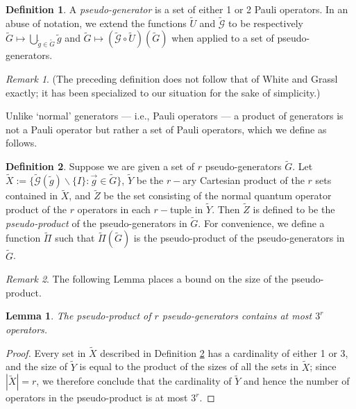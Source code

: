 \documentclass{amsbook}
\theoremstyle{plain}
\newtheorem{lemma}{Lemma}
\theoremstyle{definition}
\newtheorem{definition}{Definition}
\theoremstyle{remark}
\newtheorem{remark}{Remark}
\newcommand{\lst}{\vec}
\newcommand{\set}{\tilde}
\newcommand{\genfun}{\tilde{\mathcal{G}}}
\newcommand{\pseudoproduct}{\set\Pi}
\begin{document}
\begin{definition}
A \emph{pseudo-generator} is a set of either 1 or 2 Pauli operators.  In an abuse of notation, we extend the functions $\set U$ and $\genfun$ to be respectively $\set G\mapsto \bigcup_{\set g\in\set G} \set g$ and $\set G\mapsto (\genfun\circ\set U)(\set G)$ when applied to a set of pseudo-generators.
\end{definition}
\begin{remark}
(The preceding definition does not follow that of White and Grassl exactly; it has been specialized to our situation for the sake of simplicity.)

Unlike `normal' generators --- i.e., Pauli operators --- a product of generators is not a Pauli operator but rather a set of Pauli operators, which we define as follows.
\end{remark}

\begin{definition}
\label{definition:pseudo-product}
Suppose we are given a set of $r$ pseudo-generators $\set G$.  Let $\set X:=\{\genfun(\set g)\backslash\{I\}: \lst g\in\set G\}$, $\set Y$ be the $r-$ary Cartesian product of the $r$ sets contained in $\set X$, and $\set Z$ be the set consisting of the normal quantum operator product of the $r$ operators in each $r-$tuple in $\set Y$.  Then $\set Z$ is defined to be the \emph{pseudo-product} of the pseudo-generators in $\set G$.  For convenience, we define a function $\pseudoproduct$ such that $\pseudoproduct(\set G)$ is the pseudo-product of the pseudo-generators in $\set G$.
\end{definition}

\begin{remark}
The following Lemma places a bound on the size of the pseudo-product.
\end{remark}

\begin{lemma}
\label{lemma:bound-on-pseudo-product}
The pseudo-product of $r$ pseudo-generators contains at most $3^r$ operators.
\end{lemma}

\begin{proof}
Every set in $\set X$ described in Definition \ref{definition:pseudo-product} has a cardinality of either 1 or 3, and the size of $\set Y$ is equal to the product of the sizes of all the sets in $\set X$;  since $|\set X|=r$, we therefore conclude that the cardinality of $\set Y$ and hence the number of operators in the pseudo-product is at most $3^r$.
\end{proof}
\end{document}
